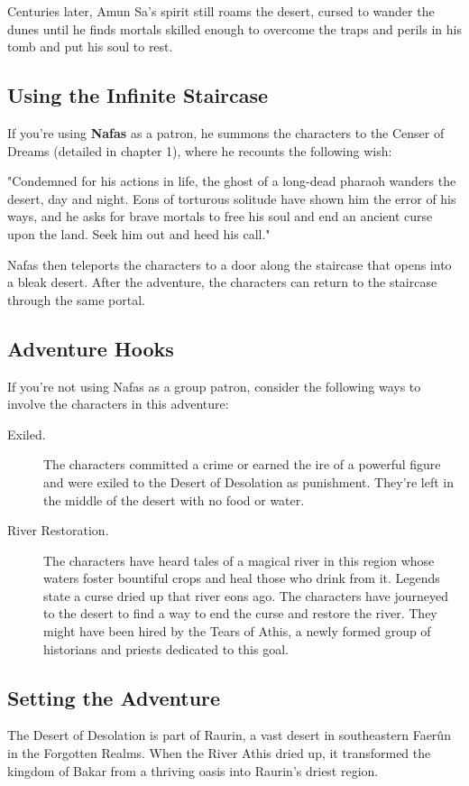 \documentclass[10pt,a4paper,twoside,bg=print,twocolumn,openany,nodeprecatedcode]{dndbook}
\begin{document}
Centuries later, Amun Sa's spirit still roams the desert, cursed to wander the dunes until he finds mortals skilled enough to overcome the traps and perils in his tomb and put his soul to rest.

\subsection{Using the Infinite Staircase}
If you're using \textbf{Nafas} as a patron, he summons the characters to the Censer of Dreams (detailed in chapter 1), where he recounts the following wish:

\begin{DndReadAloud}{}
"Condemned for his actions in life, the ghost of a long-dead pharaoh wanders the desert, day and night. Eons of torturous solitude have shown him the error of his ways, and he asks for brave mortals to free his soul and end an ancient curse upon the land. Seek him out and heed his call."

\end{DndReadAloud}

Nafas then teleports the characters to a door along the staircase that opens into a bleak desert. After the adventure, the characters can return to the staircase through the same portal.

\subsection{Adventure Hooks}
If you're not using Nafas as a group patron, consider the following ways to involve the characters in this adventure:


\begin{description}
\item[Exiled.]
The characters committed a crime or earned the ire of a powerful figure and were exiled to the Desert of Desolation as punishment. They're left in the middle of the desert with no food or water.
\item[River Restoration.]
The characters have heard tales of a magical river in this region whose waters foster bountiful crops and heal those who drink from it. Legends state a curse dried up that river eons ago. The characters have journeyed to the desert to find a way to end the curse and restore the river. They might have been hired by the Tears of Athis, a newly formed group of historians and priests dedicated to this goal.
\end{description}

\subsection{Setting the Adventure}
The Desert of Desolation is part of Raurin, a vast desert in southeastern Faerûn in the Forgotten Realms. When the River Athis dried up, it transformed the kingdom of Bakar from a thriving oasis into Raurin's driest region.
\end{document}
